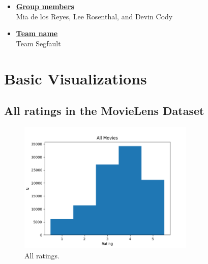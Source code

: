 \newif\ifshowsolutions
\showsolutionstrue

\newcommand{\boldline}[1]{\underline{\textbf{#1}}}



\pagestyle{fancy}

\begin{itemize}

    \item \boldline{Group members} \\
    Mia de los Reyes, Lee Rosenthal, and Devin Cody
    
    \item \boldline{Team name} \\
    Team Segfault
    
\end{itemize}

\section{Basic Visualizations}

\subsection{All ratings in the MovieLens Dataset}
    \begin{figure}[H]
    \centering
    \includegraphics[width=0.75\textwidth]{../Figures/allratings.png}
    \caption{All ratings.}
    \end{figure}
    

